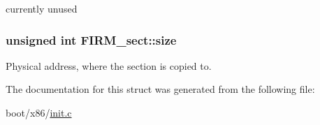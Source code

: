 currently unused 

\hypertarget{struct_f_i_r_m__sect_a9e91b2a4f35d02c240ff8fed515ca4f4}{}
\subsubsection[{size}]{\setlength{\rightskip}{0pt plus 5cm}unsigned int F\+I\+R\+M\+\_\+sect\+::size}\label{struct_f_i_r_m__sect_a9e91b2a4f35d02c240ff8fed515ca4f4}


Physical address, where the section is copied to. 



The documentation for this struct was generated from the following file\+:\begin{DoxyCompactItemize}
\item 
boot/x86/\hyperlink{init_8c}{init.\+c}\end{DoxyCompactItemize}
